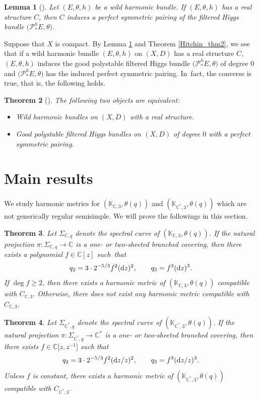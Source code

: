 \documentclass[pdftex]{sigma}
\numberwithin{equation}{section}
\newtheorem{Theorem}{Theorem}[section]
\newtheorem{Lemma}[Theorem]{Lemma}
\newcommand{\C}{\mathbb{C}}
\begin{document}
\begin{Lemma}[{\cite[Lemma 3.16]{LM1}}]\label{lemma_real_str}
 Let $(E,\theta,h)$ be a wild harmonic bundle. If $(E,\theta,h)$ has a real structure $C$, then $C$ induces a perfect symmetric pairing of the filtered Higgs bundle $\bigl(\mathcal{P}_{*}^{h} E,\theta\bigr)$.
\end{Lemma}
Suppose that $X$ is compact. By Lemma \ref{lemma_real_str} and Theorem \ref{Hitchin_thm2}, we see that if a wild harmonic bundle $(E,\theta,h)$ on $(X,D)$ has a real structure $C$, $(E,\theta,h)$ induces the good polystable filtered Higgs bundle $\bigl(\mathcal{P}_{*}^{h} E,\theta\bigr)$ of degree $0$ and $\bigl(\mathcal{P}_{*}^{h} E,\theta\bigr)$ has the induced perfect symmetric pairing. In~fact, the converse is true, that is, the following holds.
\begin{Theorem}[{\cite[Theorem 3.28]{LM1}}]\label{correspond_thm}
 The following two objects are equivalent:
 \begin{itemize}\itemsep=0pt
 \item Wild harmonic bundles on $(X,D)$ with a real structure.
 \item Good polystable filtered Higgs bundles on $(X,D)$ of degree $0$ with a perfect symmetric pairing.
 \end{itemize}
\end{Theorem}

\section{Main results}
We study harmonic metrics for $(\mathbb{K}_{\C,3},\theta(q))$ and $(\mathbb{K}_{\C^*,3},\theta(q))$ which are not generically regular semisimple. We will prove the followings in this section.
\begin{Theorem}\label{main'}
 Let $\Sigma_{\C,q}$ denote the spectral curve of $(\mathbb{K}_{\C,3},\theta(q))$. If the natural projection $\pi\colon \Sigma_{\C,q}\to \C$ is a one- or two-sheeted branched covering, then there exists a polynomial $f\in \C[z]$ such~that
 \begin{equation*}
 q_2 = 3\cdot 2^{-5/3}f^2 ({\rm d}z)^2, \qquad q_3 = f^3 ({\rm d}z)^3.
 \end{equation*}
 If $\deg{f}\geq 2$, then there exists a harmonic metric of $(\mathbb{K}_{\C,3},\theta(q))$ compatible with $C_{\C,3}$. Otherwise, there does not exist any harmonic metric compatible with $C_{\C,3}$.
\end{Theorem}

\begin{Theorem}\label{main_Cstar'}
 Let $\Sigma_{\C^*,q}$ denote the spectral curve of $(\mathbb{K}_{\C^*,3},\theta(q))$.
 If the natural projection $\pi\colon \Sigma_{\C^*,q}\to \C^*$ is a one- or two-sheeted branched covering, then there exists $f\in \C\bigl[z,z^{-1}\bigr]$ such that
 \begin{equation*}
 q_2 = 3\cdot 2^{-5/3}f^2 ({\rm d}z/z)^2, \qquad q_3 = f^3 ({\rm d}z/z)^3.
 \end{equation*}
 Unless $f$ is constant, there exists a harmonic metric of $(\mathbb{K}_{\C^*,3},\theta(q))$ compatible with $C_{\C^*,3}$.
\end{Theorem}
\end{document}
